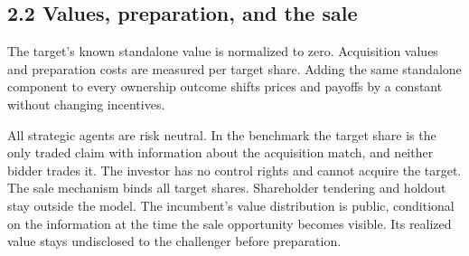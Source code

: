 
\subsection{2.2 Values, preparation, and the
sale}\label{sec-values-preparation-and-the-sale}

The target's known standalone value is normalized to zero. Acquisition
values and preparation costs are measured per target share. Adding the
same standalone component to every ownership outcome shifts prices and
payoffs by a constant without changing incentives.

All strategic agents are risk neutral. In the benchmark the target
share is the only traded claim with information about the acquisition
match, and neither bidder trades it. The investor has no control
rights and cannot acquire the target. The sale mechanism binds all
target shares. Shareholder tendering and holdout stay outside the
model. The incumbent's value distribution is public, conditional on
the information at the time the sale opportunity becomes visible. Its
realized value stays undisclosed to the challenger before preparation.

